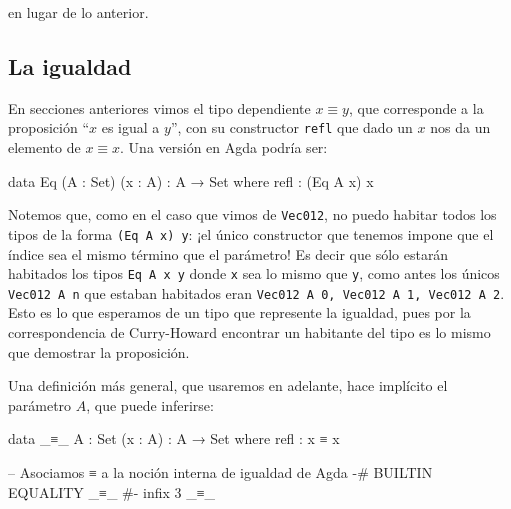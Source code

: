 \documentclass[11pt]{article} %
\begin{document}
en lugar de lo anterior.

\subsection{La igualdad}
En secciones anteriores vimos el tipo dependiente $x ≡ y$, que corresponde a la proposición ``$x$ es igual a $y$'', con su constructor \texttt{refl} que dado un $x$ nos da un elemento de $x ≡ x$. Una versión en Agda podría ser:

\begin{code}
data Eq (A : Set) (x : A) : A → Set where
    refl : (Eq A x) x
\end{code}

Notemos que, como en el caso que vimos de \verb|Vec012|, no puedo habitar todos los tipos de la forma \verb|(Eq A x) y|: ¡el único constructor que tenemos impone que el índice sea el mismo término que el parámetro! Es decir que sólo estarán habitados los tipos \verb|Eq A x y| donde \verb|x| sea lo mismo que \verb|y|, como antes los únicos \verb|Vec012 A n| que estaban habitados eran  \verb|Vec012 A 0, Vec012 A 1, Vec012 A 2|. Esto es lo que esperamos de un tipo que represente la igualdad, pues por la correspondencia de Curry-Howard encontrar un habitante del tipo es lo mismo que demostrar la proposición. 


Una definición más general, que usaremos en adelante, hace implícito el parámetro $A$, que puede inferirse:


\begin{code}
data _≡_ {A : Set} (x : A) : A → Set where
    refl : x ≡ x


-- Asociamos ≡ a la noción interna de igualdad de Agda
{-# BUILTIN EQUALITY _≡_ #-}
infix 3 _≡_
\end{code}
\end{document}
